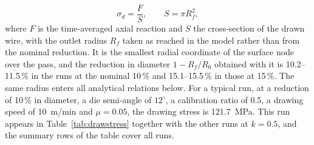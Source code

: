 \begin{equation}
\sigma_d = \frac{F}{S}, \qquad S = \pi R_f^2,
\label{eq:sigma-d}
\end{equation}
where $F$ is the time-averaged axial reaction and $S$ the cross-section of the drawn wire, with
the outlet radius $R_f$ taken as reached in the model rather than from the nominal reduction. It is
the smallest radial coordinate of the surface node over the pass, and the reduction in diameter
$1-R_f/R_0$ obtained with it is 10.2--11.5\,\% in the runs at the nominal 10\,\% and 15.1--15.5\,\%
in those at 15\,\%. The same radius enters all analytical relations below.
For a typical run, at a reduction of 10\,\% in
diameter, a die semi-angle of $12^\circ$, a calibration ratio of 0.5, a drawing speed of 10~m/min and
$\mu = 0.05$, the drawing stress is 121.7~MPa. This run appears in Table~\ref{tab:drawstress}
together with the other runs at $k = 0.5$, and the summary rows of the table cover all runs.

